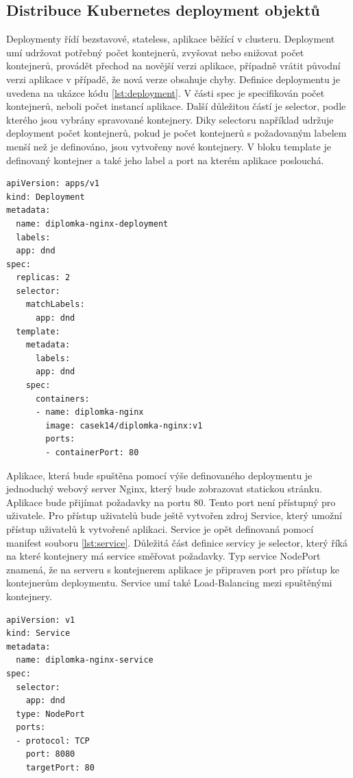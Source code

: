 \subsection{Distribuce Kubernetes deployment objektů}
Deploymenty řídí bezstavové, stateless, aplikace běžící v clusteru. Deployment umí udržovat potřebný počet kontejnerů, zvyšovat nebo snižovat počet kontejnerů, provádět přechod na novější verzi aplikace, případně vrátit původní verzi aplikace v případě, že nová verze obsahuje chyby. Definice deploymentu je uvedena na ukázce kódu \ref{lst:deployment}. V části spec je specifikován počet kontejnerů, neboli počet instancí aplikace. Další důležitou částí je selector, podle kterého jsou vybrány spravované kontejnery. Diky selectoru například udržuje deployment počet kontejnerů, pokud je počet kontejnerů s požadovaným labelem menší než je definováno, jsou vytvořeny nové kontejnery. V bloku template je definovaný kontejner a také jeho label a port na kterém aplikace poslouchá.
\begin{lstlisting}[caption={deployment.yml, definice deploymentu},label=lst:deployment]
apiVersion: apps/v1
kind: Deployment
metadata:
  name: diplomka-nginx-deployment
  labels:
  app: dnd
spec:
  replicas: 2
  selector:
    matchLabels:
      app: dnd
  template:
    metadata:
      labels:
      app: dnd
    spec:
      containers:
      - name: diplomka-nginx
        image: casek14/diplomka-nginx:v1
        ports:
        - containerPort: 80
\end{lstlisting}
													     Aplikace, která bude spuštěna pomocí výše definovaného deploymentu je jednoduchý webový server Nginx, který bude zobrazovat statickou stránku. Aplikace bude přijímat požadavky na portu 80. Tento port není přístupný pro uživatele. Pro přístup uživatelů bude ještě vytvořen zdroj Service, který umožní přístup uživatelů k vytvořené aplikaci. Service je opět definovaná pomocí manifest souboru \ref{lst:service}. Důležitá část definice servicy je selector, který říká na které kontejnery má service směřovat požadavky. Typ service NodePort znamená, že na serveru s kontejnerem aplikace je připraven port pro přístup ke kontejnerům deploymentu. Service umí také Load-Balancing mezi spuštěnými kontejnery. 
\begin{lstlisting}[caption={service.yml, definice service},label=lst:service]
apiVersion: v1
kind: Service
metadata:
  name: diplomka-nginx-service
spec:
  selector:
    app: dnd
  type: NodePort
  ports:
  - protocol: TCP
    port: 8080
    targetPort: 80
\end{lstlisting}

